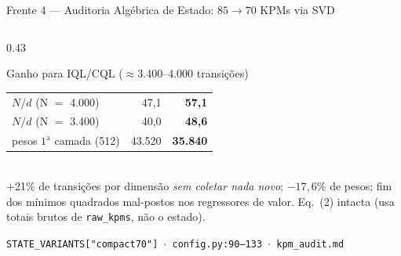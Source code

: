 \documentclass[aspectratio=169,10pt,xcolor={dvipsnames,table}]{beamer}
\newcommand{\datapath}[1]{{\scriptsize\color{darkgray}\texttt{#1}}}
\begin{document}
\begin{frame}{Frente 4 --- Auditoria Alg\'ebrica de Estado: $85 \to 70$ KPMs via SVD}
\begin{columns}[T]
\begin{column}{0.43\textwidth}
\begin{block}{Ganho para IQL/CQL ($\approx$3.400--4.000 transições)}
\begin{tabular}{@{}lrr@{}}
          \midrule
          $N/d$ (N $=$ 4.000) & 47,1 & \textbf{57,1} \\
          $N/d$ (N $=$ 3.400) & 40,0 & \textbf{48,6} \\
          pesos $1^{\text{a}}$ camada (512) & 43.520 & \textbf{35.840} \\
          \bottomrule
        \end{tabular}
        \vspace{1mm}\\
        \small $+$21\% de transições por dimensão \emph{sem coletar nada
        novo}; $-17{,}6\%$ de pesos; fim dos mínimos quadrados mal-postos nos
        regressores de valor. Eq.~(2) intacta (usa totais brutos de
        \texttt{raw\_kpms}, não o estado).
      \end{block}
      \vspace{-1mm}
      \datapath{STATE\_VARIANTS["compact70"] $\cdot$ config.py:90--133 $\cdot$ kpm\_audit.md}
    \end{column}
  \end{columns}
\end{frame}
\end{document}
